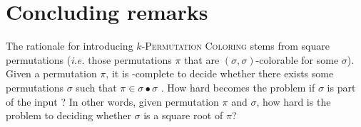 \section{Concluding remarks}
\label{section:Concluding remarks}

The rationale for introducing \textsc{$k$-Permutation Coloring} stems
from square permutations (\emph{i.e.} those permutations $\pi$ that are
$(\sigma, \sigma)$-colorable for some $\sigma$).
Given a permutation $\pi$, it is \NP-complete to decide
whether there exists some permutations $\sigma$ such that
$\pi \in \sigma \bullet \sigma$ \cite{DBLP:journals/tcs/GiraudoV18}.
How hard becomes the problem if $\sigma$ is part of the input ?
In other words, given permutation $\pi$ and $\sigma$, how hard is the problem
to deciding whether $\sigma$ is a square root
of $\pi$?

